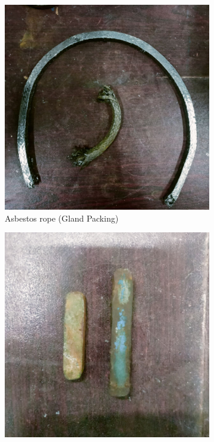 \documentclass[12pt]{article}
\begin{document}
\begin{figure}
  \begin{subfigure}{0.3\textwidth}
      \includegraphics[width=\linewidth]{img/p_07.jpg}
      \caption{Asbestos rope (Gland Packing)}
  \end{subfigure}
  \hfill
  \begin{subfigure}{0.3\textwidth}
      \includegraphics[width=\linewidth]{img/p_08.jpg}

\end{subfigure}
\end{figure}
\end{document}
